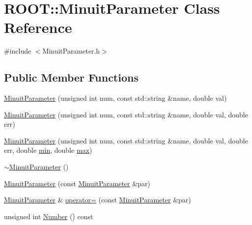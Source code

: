 \hypertarget{classROOT_1_1Minuit2_1_1MinuitParameter}{}\section{R\+O\+OT\+:\+:Minuit\+Parameter Class Reference}
\label{classROOT_1_1Minuit2_1_1MinuitParameter}


{\ttfamily \#include $<$Minuit\+Parameter.\+h$>$}

\subsection*{Public Member Functions}
\begin{DoxyCompactItemize}
\item 
\mbox{\hyperlink{classROOT_1_1Minuit2_1_1MinuitParameter_afa9a57b4990491316502a21e09b756bc}{Minuit\+Parameter}} (unsigned int num, const std\+::string \&name, double val)
\item 
\mbox{\hyperlink{classROOT_1_1Minuit2_1_1MinuitParameter_a56d290ba2abc3c599cff99187329a91a}{Minuit\+Parameter}} (unsigned int num, const std\+::string \&name, double val, double err)
\item 
\mbox{\hyperlink{classROOT_1_1Minuit2_1_1MinuitParameter_a13b433906347405bf85ef2bdf5803990}{Minuit\+Parameter}} (unsigned int num, const std\+::string \&name, double val, double err, double \mbox{\hyperlink{SU3__internal_8h_ab0f5fed3171eb00d1c5f037d9f518a23}{min}}, double \mbox{\hyperlink{SU3__internal_8h_ace7f45ceb252a2dfbf29b98bc81cb8ba}{max}})
\item 
\mbox{\hyperlink{classROOT_1_1Minuit2_1_1MinuitParameter_a487d895f06a46c8c2e1e3dbc97dd0a26}{$\sim$\+Minuit\+Parameter}} ()
\item 
\mbox{\hyperlink{classROOT_1_1Minuit2_1_1MinuitParameter_a0ac95809b18c619597764fcfabcb70fe}{Minuit\+Parameter}} (const \mbox{\hyperlink{classROOT_1_1Minuit2_1_1MinuitParameter}{Minuit\+Parameter}} \&par)
\item 
\mbox{\hyperlink{classROOT_1_1Minuit2_1_1MinuitParameter}{Minuit\+Parameter}} \& \mbox{\hyperlink{classROOT_1_1Minuit2_1_1MinuitParameter_ae26eba9113194d198e988d7c87057398}{operator=}} (const \mbox{\hyperlink{classROOT_1_1Minuit2_1_1MinuitParameter}{Minuit\+Parameter}} \&par)
\item 
unsigned int \mbox{\hyperlink{classROOT_1_1Minuit2_1_1MinuitParameter_aaa2361c2954576d90a0dffcf2e049eea}{Number}} () const
\item 

\end{DoxyCompactItemize}
